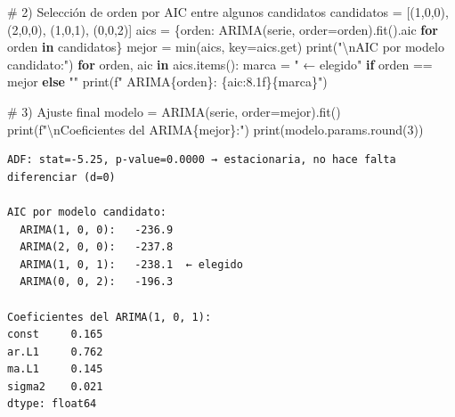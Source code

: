 \documentclass[
  spanish,
  letterpaper,
  DIV=11,
  numbers=noendperiod]{scrreprt}
\newenvironment{Shaded}{\begin{snugshade}}{\end{snugshade}}
\newcommand{\BuiltInTok}[1]{\textcolor[rgb]{0.00,0.23,0.31}{#1}}
\newcommand{\CharTok}[1]{\textcolor[rgb]{0.13,0.47,0.30}{#1}}
\newcommand{\CommentTok}[1]{\textcolor[rgb]{0.37,0.37,0.37}{#1}}
\newcommand{\ControlFlowTok}[1]{\textcolor[rgb]{0.00,0.23,0.31}{\textbf{#1}}}
\newcommand{\DecValTok}[1]{\textcolor[rgb]{0.68,0.00,0.00}{#1}}
\newcommand{\KeywordTok}[1]{\textcolor[rgb]{0.00,0.23,0.31}{\textbf{#1}}}
\newcommand{\NormalTok}[1]{\textcolor[rgb]{0.00,0.23,0.31}{#1}}
\newcommand{\OperatorTok}[1]{\textcolor[rgb]{0.37,0.37,0.37}{#1}}
\newcommand{\SpecialCharTok}[1]{\textcolor[rgb]{0.37,0.37,0.37}{#1}}
\newcommand{\SpecialStringTok}[1]{\textcolor[rgb]{0.13,0.47,0.30}{#1}}
\newcommand{\StringTok}[1]{\textcolor[rgb]{0.13,0.47,0.30}{#1}}
\begin{document}
\begin{Shaded}
\begin{Highlighting}[]
\CommentTok{\# 2) Selección de orden por AIC entre algunos candidatos}
\NormalTok{candidatos }\OperatorTok{=}\NormalTok{ [(}\DecValTok{1}\NormalTok{,}\DecValTok{0}\NormalTok{,}\DecValTok{0}\NormalTok{), (}\DecValTok{2}\NormalTok{,}\DecValTok{0}\NormalTok{,}\DecValTok{0}\NormalTok{), (}\DecValTok{1}\NormalTok{,}\DecValTok{0}\NormalTok{,}\DecValTok{1}\NormalTok{), (}\DecValTok{0}\NormalTok{,}\DecValTok{0}\NormalTok{,}\DecValTok{2}\NormalTok{)]}
\NormalTok{aics }\OperatorTok{=}\NormalTok{ \{orden: ARIMA(serie, order}\OperatorTok{=}\NormalTok{orden).fit().aic }\ControlFlowTok{for}\NormalTok{ orden }\KeywordTok{in}\NormalTok{ candidatos\}}
\NormalTok{mejor }\OperatorTok{=} \BuiltInTok{min}\NormalTok{(aics, key}\OperatorTok{=}\NormalTok{aics.get)}
\BuiltInTok{print}\NormalTok{(}\StringTok{"}\CharTok{\textbackslash{}n}\StringTok{AIC por modelo candidato:"}\NormalTok{)}
\ControlFlowTok{for}\NormalTok{ orden, aic }\KeywordTok{in}\NormalTok{ aics.items():}
\NormalTok{    marca }\OperatorTok{=} \StringTok{"  ← elegido"} \ControlFlowTok{if}\NormalTok{ orden }\OperatorTok{==}\NormalTok{ mejor }\ControlFlowTok{else} \StringTok{""}
    \BuiltInTok{print}\NormalTok{(}\SpecialStringTok{f"  ARIMA}\SpecialCharTok{\{}\NormalTok{orden}\SpecialCharTok{\}}\SpecialStringTok{: }\SpecialCharTok{\{}\NormalTok{aic}\SpecialCharTok{:8.1f\}\{}\NormalTok{marca}\SpecialCharTok{\}}\SpecialStringTok{"}\NormalTok{)}

\CommentTok{\# 3) Ajuste final}
\NormalTok{modelo }\OperatorTok{=}\NormalTok{ ARIMA(serie, order}\OperatorTok{=}\NormalTok{mejor).fit()}
\BuiltInTok{print}\NormalTok{(}\SpecialStringTok{f"}\CharTok{\textbackslash{}n}\SpecialStringTok{Coeficientes del ARIMA}\SpecialCharTok{\{}\NormalTok{mejor}\SpecialCharTok{\}}\SpecialStringTok{:"}\NormalTok{)}
\BuiltInTok{print}\NormalTok{(modelo.params.}\BuiltInTok{round}\NormalTok{(}\DecValTok{3}\NormalTok{))}
\end{Highlighting}
\end{Shaded}

\begin{verbatim}
ADF: stat=-5.25, p-value=0.0000 → estacionaria, no hace falta diferenciar (d=0)

AIC por modelo candidato:
  ARIMA(1, 0, 0):   -236.9
  ARIMA(2, 0, 0):   -237.8
  ARIMA(1, 0, 1):   -238.1  ← elegido
  ARIMA(0, 0, 2):   -196.3

Coeficientes del ARIMA(1, 0, 1):
const     0.165
ar.L1     0.762
ma.L1     0.145
sigma2    0.021
dtype: float64
\end{verbatim}
\end{document}
